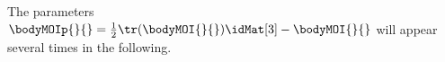 The parameters $\bodyMOIp{}{} = \tfrac{1}{2} \tr(\bodyMOI{}{})\idMat[3] - \bodyMOI{}{}$ will appear several times in the following.


